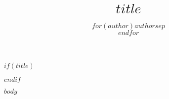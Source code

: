 \documentclass[master=mai,masteroption=ecs]{kulemt}
\title{$title$}
\title{}
\author{$for(author)$$author$$sep$ \\ $endfor$}
\author{}
\begin{document}
$if(title)$
\maketitle
$endif$

$body$
\end{document}
